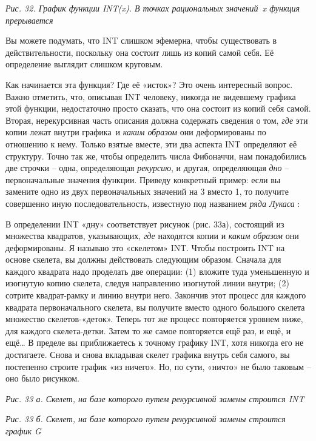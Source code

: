 \documentclass[../main.tex]{subfiles}
\begin{document}
\emph{Рис. 32. График функции INT(x). В точках рациональных значений~x функция прерывается}

Вы можете подумать, что INT слишком эфемерна, чтобы существовать в действительности, поскольку она состоит лишь из копий самой себя. Её определение выглядит слишком круговым.

Как начинается эта функция? Где её «исток»? Это очень интересный вопрос. Важно отметить, что, описывая INT человеку, никогда не видевшему графика этой функции, недостаточно просто сказать, что она состоит из копий себя самой. Вторая, нерекурсивная часть описания должна содержать сведения о том, \emph{где} эти копии лежат внутри графика~и \emph{каким образом} они деформированы по отношению к нему. Только взятые вместе, эти два аспекта INT определяют её структуру. Точно так же, чтобы определить числа Фибоначчи, нам понадобились две строчки \--- одна, определяющая \emph{рекурсию}, и другая, определяющая \emph{дно} \--- первоначальные значения функции. Приведу конкретный пример: если вы замените одно из двух первоначальных значений на 3 вместо 1, то получите совершенно иную последовательность, известную под названием \emph{ряда Лукаса} :

В определении INT «дну» соответствует рисунок (рис. 33а), состоящий из множества квадратов, указывающих, \emph{где} находятся копии и \emph{каким образом} они деформированы. Я называю это «скелетом» INT\@. Чтобы построить INT на основе скелета, вы должны действовать следующим образом. Сначала для каждого квадрата надо проделать две операции: (1) вложите туда уменьшенную и изогнутую копию скелета, следуя направлению изогнутой линии внутри; (2) сотрите квадрат-рамку и линию внутри него. Закончив этот процесс для каждого квадрата первоначального скелета, вы получите вместо одного большого скелета множество скелетов-«деток». Теперь тот же процесс повторяется уровнем ниже, для каждого скелета-детки. Затем то же самое повторяется ещё раз, и ещё, и ещё\ldots{} В пределе вы приближаетесь к точному графику INT, хотя никогда его не достигаете. Снова и снова вкладывая скелет графика внутрь себя самого, вы постепенно строите график «из ничего». Но, по сути, «ничто» не было таковым \--- оно было рисунком.

\emph{Рис. 33 а. Скелет, на базе которого путем рекурсивной замены строится INT}

\emph{Рис. 33 б. Скелет, на базе которого путем рекурсивной замены строится график G}
\end{document}
